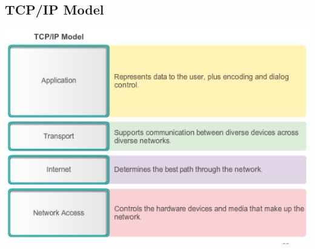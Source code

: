 \documentclass[11pt]{article}
\begin{document}
\subsection{TCP/IP Model}
\includegraphics[width=\textwidth]{tcp-ip-model}
\end{document}
